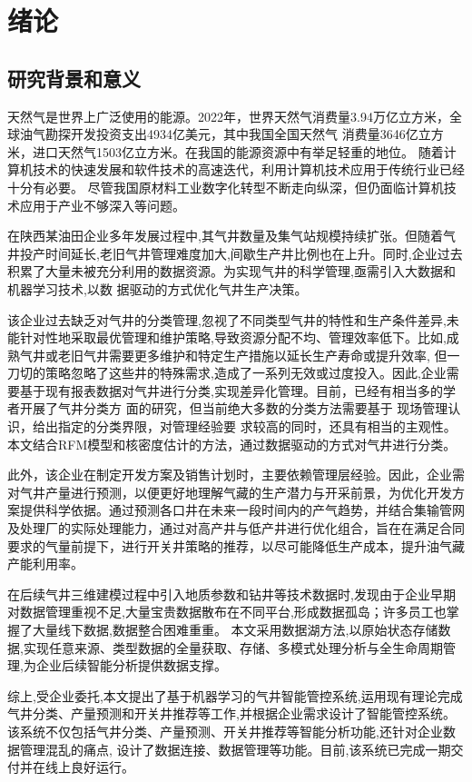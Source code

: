 \chapter{绪论}
\section{研究背景和意义}
天然气是世界上广泛使用的能源。2022年，世界天然气消费量3.94万亿立方米，全球油气勘探开发投资支出4934亿美元，其中我国全国天然气
消费量3646亿立方米，进口天然气1503亿立方米\cite{chinaGasGOv}。在我国的能源资源中有举足轻重的地位。
随着计算机技术的快速发展和软件技术的高速迭代，利用计算机技术应用于传统行业已经十分有必要。
尽管我国原材料工业数字化转型不断走向纵深，但仍面临计算机技术应用于产业不够深入等问题\cite{workplanForPetrochemical}。

在陕西某油田企业多年发展过程中,其气井数量及集气站规模持续扩张。但随着气井投产时间延长,老旧气井管理难度加大,间歇生产井比例也在上升。同时,企业过去积累了大量未被充分利用的数据资源。为实现气井的科学管理,亟需引入大数据和机器学习技术,以数
据驱动的方式优化气井生产决策。

该企业过去缺乏对气井的分类管理,忽视了不同类型气井的特性和生产条件差异,未能针对性地采取最优管理和维护策略,导致资源分配不均、管理效率低下。比如,成熟气井或老旧气井需要更多维护和特定生产措施以延长生产寿命或提升效率,
但一刀切的策略忽略了这些井的特殊需求,造成了一系列无效或过度投入。因此,企业需要基于现有报表数据对气井进行分类,实现差异化管理。目前，已经有相当多的学者开展了气井分类方
面的研究，但当前绝大多数的分类方法需要基于
现场管理认识，给出指定的分类界限，对管理经验要
求较高的同时，还具有相当的主观性\cite{SYZC202104015}。本文结合RFM模型\cite{birant2011data}和核密度估计\cite{chen2017tutorial}的方法，通过数据驱动的方式对气井进行分类。

此外，该企业在制定开发方案及销售计划时，主要依赖管理层经验。因此，企业需对气井产量进行预测，以便更好地理解气藏的生产潜力与开采前景，为优化开发方案提供科学依据。通过预测各口井在未来一段时间内的产气趋势，并结合集输管网
及处理厂的实际处理能力，通过对高产井与低产井进行优化组合，旨在在满足合同要求的气量前提下，进行开关井策略的推荐，以尽可能降低生产成本，提升油气藏产能利用率。

在后续气井三维建模过程中引入地质参数和钻井等技术数据时,发现由于企业早期对数据管理重视不足,大量宝贵数据散布在不同平台,形成数据孤岛；许多员工也掌握了大量线下数据,数据整合困难重重。
本文采用数据湖方法,以原始状态存储数据,实现任意来源、类型数据的全量获取、存储、多模式处理分析与全生命周期管理,为企业后续智能分析提供数据支撑。

综上,受企业委托,本文提出了基于机器学习的气井智能管控系统,运用现有理论完成气井分类、产量预测和开关井推荐等工作,并根据企业需求设计了智能管控系统。
该系统不仅包括气井分类、产量预测、开关井推荐等智能分析功能,还针对企业数据管理混乱的痛点,
设计了数据连接、数据管理等功能。目前,该系统已完成一期交付并在线上良好运行。

